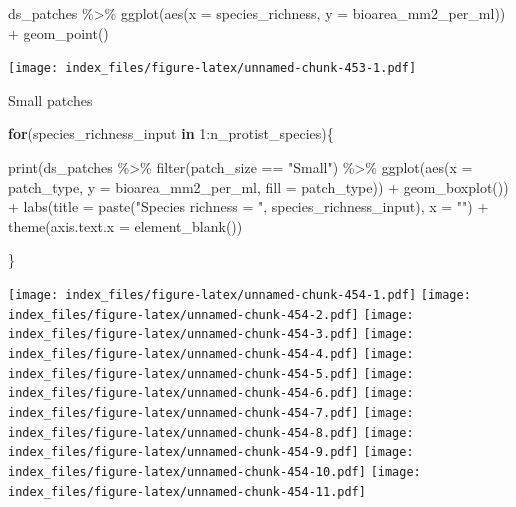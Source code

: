 \documentclass[
]{article}
\newenvironment{Shaded}{\begin{snugshade}}{\end{snugshade}}
\newcommand{\AttributeTok}[1]{\textcolor[rgb]{0.77,0.63,0.00}{#1}}
\newcommand{\ControlFlowTok}[1]{\textcolor[rgb]{0.13,0.29,0.53}{\textbf{#1}}}
\newcommand{\DecValTok}[1]{\textcolor[rgb]{0.00,0.00,0.81}{#1}}
\newcommand{\FunctionTok}[1]{\textcolor[rgb]{0.00,0.00,0.00}{#1}}
\newcommand{\NormalTok}[1]{#1}
\newcommand{\SpecialCharTok}[1]{\textcolor[rgb]{0.00,0.00,0.00}{#1}}
\newcommand{\StringTok}[1]{\textcolor[rgb]{0.31,0.60,0.02}{#1}}
\begin{document}
\begin{Shaded}
\begin{Highlighting}[]
\NormalTok{ds\_patches }\SpecialCharTok{\%\textgreater{}\%}
  \FunctionTok{ggplot}\NormalTok{(}\FunctionTok{aes}\NormalTok{(}\AttributeTok{x =}\NormalTok{ species\_richness,}
             \AttributeTok{y =}\NormalTok{ bioarea\_mm2\_per\_ml)) }\SpecialCharTok{+}
  \FunctionTok{geom\_point}\NormalTok{()}
\end{Highlighting}
\end{Shaded}

\texttt{[image: index\_files/figure-latex/unnamed-chunk-453-1.pdf]}

Small patches

\begin{Shaded}
\begin{Highlighting}[]
\ControlFlowTok{for}\NormalTok{(species\_richness\_input }\ControlFlowTok{in} \DecValTok{1}\SpecialCharTok{:}\NormalTok{n\_protist\_species)\{}
  
  \FunctionTok{print}\NormalTok{(ds\_patches }\SpecialCharTok{\%\textgreater{}\%}
     \FunctionTok{filter}\NormalTok{(patch\_size }\SpecialCharTok{==} \StringTok{"Small"}\NormalTok{) }\SpecialCharTok{\%\textgreater{}\%}
     \FunctionTok{ggplot}\NormalTok{(}\FunctionTok{aes}\NormalTok{(}\AttributeTok{x =}\NormalTok{ patch\_type,}
                \AttributeTok{y =}\NormalTok{ bioarea\_mm2\_per\_ml,}
                \AttributeTok{fill =}\NormalTok{ patch\_type)) }\SpecialCharTok{+}
     \FunctionTok{geom\_boxplot}\NormalTok{()) }\SpecialCharTok{+}
    \FunctionTok{labs}\NormalTok{(}\AttributeTok{title =} \FunctionTok{paste}\NormalTok{(}\StringTok{"Species richness = "}\NormalTok{, species\_richness\_input),}
         \AttributeTok{x =} \StringTok{""}\NormalTok{) }\SpecialCharTok{+}
    \FunctionTok{theme}\NormalTok{(}\AttributeTok{axis.text.x =} \FunctionTok{element\_blank}\NormalTok{())}
  
\NormalTok{\}}
\end{Highlighting}
\end{Shaded}

\texttt{[image: index\_files/figure-latex/unnamed-chunk-454-1.pdf]}
\texttt{[image: index\_files/figure-latex/unnamed-chunk-454-2.pdf]}
\texttt{[image: index\_files/figure-latex/unnamed-chunk-454-3.pdf]}
\texttt{[image: index\_files/figure-latex/unnamed-chunk-454-4.pdf]}
\texttt{[image: index\_files/figure-latex/unnamed-chunk-454-5.pdf]}
\texttt{[image: index\_files/figure-latex/unnamed-chunk-454-6.pdf]}
\texttt{[image: index\_files/figure-latex/unnamed-chunk-454-7.pdf]}
\texttt{[image: index\_files/figure-latex/unnamed-chunk-454-8.pdf]}
\texttt{[image: index\_files/figure-latex/unnamed-chunk-454-9.pdf]}
\texttt{[image: index\_files/figure-latex/unnamed-chunk-454-10.pdf]}
\texttt{[image: index\_files/figure-latex/unnamed-chunk-454-11.pdf]}
\end{document}
